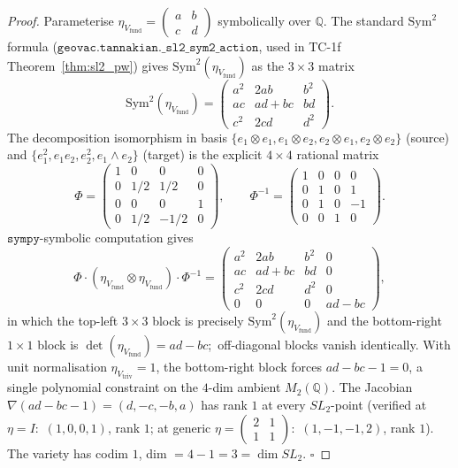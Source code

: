 \documentclass[11pt,a4paper]{article}
\theoremstyle{plain}
\theoremstyle{definition}
\newcommand{\sympy}{\texttt{sympy}}
\newcommand{\Q}{\mathbb{Q}}
\begin{document}
\begin{proof}
Parameterise $\eta_{V_{\mathrm{fund}}} = \begin{pmatrix} a & b \\ c & d \end{pmatrix}$
symbolically over $\Q$. The standard $\mathrm{Sym}^{2}$ formula
($\texttt{geovac.tannakian.\_sl2\_sym2\_action}$, used in TC-1f
Theorem~\ref{thm:sl2_pw}) gives
$\mathrm{Sym}^{2}(\eta_{V_{\mathrm{fund}}})$ as the $3 \times 3$
matrix
\[
\mathrm{Sym}^{2}(\eta_{V_{\mathrm{fund}}}) =
\begin{pmatrix}
a^{2} & 2ab & b^{2} \\
ac & ad+bc & bd \\
c^{2} & 2cd & d^{2}
\end{pmatrix}.
\]
The decomposition isomorphism in basis
$\{e_{1} \otimes e_{1}, e_{1} \otimes e_{2}, e_{2} \otimes e_{1}, e_{2} \otimes e_{2}\}$
(source) and $\{e_{1}^{2}, e_{1} e_{2}, e_{2}^{2}, e_{1} \wedge e_{2}\}$
(target) is the explicit $4 \times 4$ rational matrix
\[
\Phi = \begin{pmatrix}
1 & 0 & 0 & 0 \\
0 & 1/2 & 1/2 & 0 \\
0 & 0 & 0 & 1 \\
0 & 1/2 & -1/2 & 0
\end{pmatrix},
\qquad
\Phi^{-1} = \begin{pmatrix}
1 & 0 & 0 & 0 \\
0 & 1 & 0 & 1 \\
0 & 1 & 0 & -1 \\
0 & 0 & 1 & 0
\end{pmatrix}.
\]
$\sympy$-symbolic computation gives
\[
\Phi \cdot (\eta_{V_{\mathrm{fund}}} \otimes \eta_{V_{\mathrm{fund}}}) \cdot \Phi^{-1}
= \begin{pmatrix}
a^{2} & 2ab & b^{2} & 0 \\
ac & ad+bc & bd & 0 \\
c^{2} & 2cd & d^{2} & 0 \\
0 & 0 & 0 & ad - bc
\end{pmatrix},
\]
in which the top-left $3 \times 3$ block is precisely
$\mathrm{Sym}^{2}(\eta_{V_{\mathrm{fund}}})$ and the bottom-right
$1 \times 1$ block is $\det(\eta_{V_{\mathrm{fund}}}) = ad - bc$;\
off-diagonal blocks vanish identically. With unit normalisation
$\eta_{V_{\mathrm{triv}}} = 1$, the bottom-right block forces
$ad - bc - 1 = 0$, a single polynomial constraint on the
$4$-dim ambient $M_{2}(\Q)$. The Jacobian
$\nabla(ad - bc - 1) = (d, -c, -b, a)$ has rank $1$ at every
$SL_{2}$-point (verified at $\eta = I$:\ $(1, 0, 0, 1)$, rank $1$; at
generic $\eta = \begin{pmatrix} 2 & 1 \\ 1 & 1 \end{pmatrix}$:\
$(1, -1, -1, 2)$, rank $1$). The variety has codim $1$, dim $= 4 - 1
= 3 = \dim SL_{2}$. $\square$
\end{proof}
\end{document}
